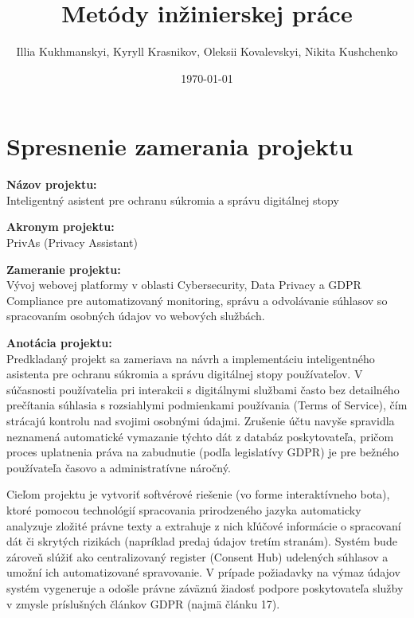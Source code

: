 \documentclass[12pt, a4paper]{article}
\title{Metódy inžinierskej práce}
\author{Illia Kukhmanskyi, Kyryll Krasnikov, Oleksii Kovalevskyi, Nikita Kushchenko}
\date{\today}
\begin{document}
\maketitle

\section*{Spresnenie zamerania projektu}

\noindent\textbf{Názov projektu:} \\
Inteligentný asistent pre ochranu súkromia a správu digitálnej stopy

\vspace{0.5cm}
\noindent\textbf{Akronym projektu:} \\
PrivAs (Privacy Assistant)

\vspace{0.5cm}
\noindent\textbf{Zameranie projektu:} \\
Vývoj webovej platformy v oblasti Cybersecurity, Data Privacy a GDPR Compliance pre automatizovaný monitoring, správu a odvolávanie súhlasov so spracovaním osobných údajov vo webových službách.

\vspace{0.5cm}
\noindent\textbf{Anotácia projektu:} \\
Predkladaný projekt sa zameriava na návrh a implementáciu inteligentného asistenta pre ochranu súkromia a správu digitálnej stopy používateľov. V súčasnosti používatelia pri interakcii s digitálnymi službami často bez detailného prečítania súhlasia s rozsiahlymi podmienkami používania (Terms of Service), čím strácajú kontrolu nad svojimi osobnými údajmi. Zrušenie účtu navyše spravidla neznamená automatické vymazanie týchto dát z databáz poskytovateľa, pričom proces uplatnenia práva na zabudnutie (podľa legislatívy GDPR) je pre bežného používateľa časovo a administratívne náročný.

Cieľom projektu je vytvoriť softvérové riešenie (vo forme interaktívneho bota), ktoré pomocou technológií spracovania prirodzeného jazyka automaticky analyzuje zložité právne texty a extrahuje z nich kľúčové informácie o spracovaní dát či skrytých rizikách (napríklad predaj údajov tretím stranám). Systém bude zároveň slúžiť ako centralizovaný register (Consent Hub) udelených súhlasov a umožní ich automatizované spravovanie. V prípade požiadavky na výmaz údajov systém vygeneruje a odošle právne záväznú žiadosť podpore poskytovateľa služby v zmysle príslušných článkov GDPR (najmä článku 17).
\end{document}
